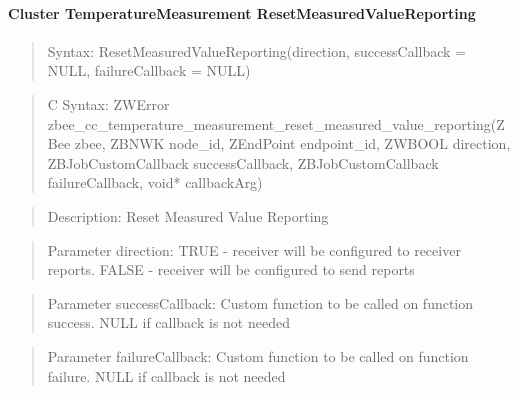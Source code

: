 \paragraph{Cluster TemperatureMeasurement ResetMeasuredValueReporting}
\begin{quote}Syntax: ResetMeasuredValueReporting(direction, successCallback = NULL, failureCallback = NULL)\end{quote}
\begin{quote}C Syntax: ZWError zbee\_cc\_temperature\_measurement\_reset\_measured\_value\_reporting(ZBee zbee, ZBNWK node\_id, ZEndPoint endpoint\_id, ZWBOOL direction, ZBJobCustomCallback successCallback, ZBJobCustomCallback failureCallback, void* callbackArg)\end{quote}
\begin{quote}Description: Reset Measured Value Reporting\end{quote}
\begin{quote}Parameter direction: TRUE  - receiver will be configured to receiver reports. FALSE - receiver will be configured to send reports\end{quote}
\begin{quote}Parameter successCallback: Custom function to be called on function success. NULL if callback is not needed\end{quote}
\begin{quote}Parameter failureCallback: Custom function to be called on function failure. NULL if callback is not needed\end{quote}


